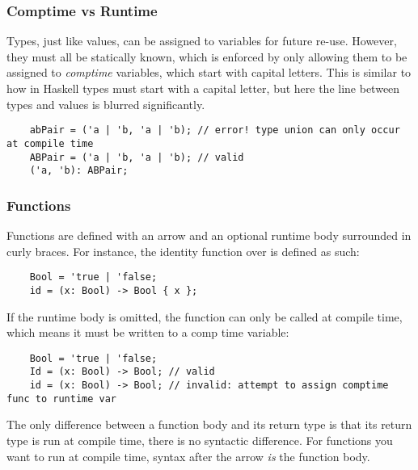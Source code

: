 \documentclass[12pt,twoside]{report}
\begin{document}
\subsubsection{Comptime vs Runtime}

Types, just like values, can be assigned to variables for future re-use. However, they must all be statically known, which is enforced by only allowing them to be assigned to \textit{comptime} variables, which start with capital letters. This is similar to how in Haskell types must start with a capital letter, but here the line between types and values is blurred significantly.

  \begin{verbatim}
    abPair = ('a | 'b, 'a | 'b); // error! type union can only occur at compile time
    ABPair = ('a | 'b, 'a | 'b); // valid
    ('a, 'b): ABPair;
  \end{verbatim}

\subsubsection{Functions}
Functions are defined with an arrow \mono{->} and an optional runtime body surrounded in curly braces. For instance, the identity function over  is defined as such:

  \begin{verbatim}
    Bool = 'true | 'false;
    id = (x: Bool) -> Bool { x };
  \end{verbatim}

If the runtime body is omitted, the function can only be called at compile time, which means it must be written to a comp time variable:

\begin{listing}[H]
  \begin{verbatim}
    Bool = 'true | 'false;
    Id = (x: Bool) -> Bool; // valid
    id = (x: Bool) -> Bool; // invalid: attempt to assign comptime func to runtime var
  \end{verbatim}
\end{listing}

The only difference between a function body and its return type is that its return type is run at compile time, there is no syntactic difference. For functions you want to run at compile time, syntax after the arrow \textit{is} the function body.
\end{document}
